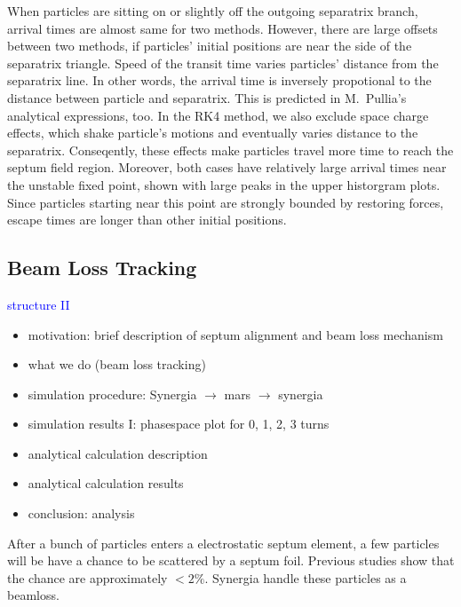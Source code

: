 \documentclass[aps,prstab,onecolumn,preprint,endfloats,11pt]{revtex4-1}
\begin{document}
When particles are sitting on or slightly off the outgoing separatrix branch, arrival times are almost same for two methods. However, there are large offsets between two methods, if particles' initial positions are near the side of the separatrix triangle. Speed of the transit time varies particles' distance from the separatrix line. In other words, the arrival time is inversely propotional to the distance between particle and separatrix. This is predicted in M.~Pullia's analytical expressions, too. In the RK4 method, we also exclude space charge effects, which shake particle's motions and eventually varies distance to the separatrix. Conseqently, these effects make particles travel more time to reach the septum field region. Moreover, both cases have relatively large arrival times near the unstable fixed point, shown with large peaks in the upper historgram plots. Since particles starting near this point are strongly bounded by restoring forces, escape times are longer than other initial positions. 



\clearpage
\subsection{\label{sec:beamloss}Beam Loss Tracking}

\textcolor{blue}{structure II}
\begin{itemize}
  \item motivation: brief description of septum alignment and beam loss mechanism
  \item what we do (beam loss tracking)
  \item simulation procedure: Synergia $\rightarrow$ mars $\rightarrow$ synergia
  \item simulation results I: phasespace plot for 0, 1, 2, 3 turns
  \item analytical calculation description
  \item analytical calculation results
  \item conclusion: analysis
\end{itemize}


After a bunch of particles enters a electrostatic septum element, a few particles will be have a chance to be scattered by a septum foil.
Previous studies show that the chance are approximately $< 2 \%$. Synergia handle these particles as a beamloss. 

\end{document}
